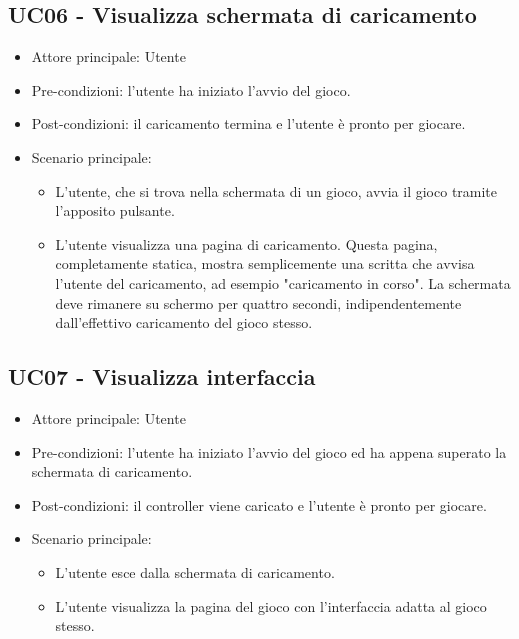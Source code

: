 \subsection{UC06 - Visualizza schermata di caricamento}
\begin{itemize}
    \item Attore principale: Utente
    \item Pre-condizioni: l'utente ha iniziato l'avvio del gioco.
    \item Post-condizioni: il caricamento termina e l'utente è pronto per giocare.
    \item Scenario principale: \begin{itemize}
        \item L'utente, che si trova nella schermata di un gioco, avvia il gioco tramite l'apposito pulsante.
        \item L'utente visualizza una pagina di caricamento. Questa pagina, completamente statica, mostra semplicemente una scritta che avvisa l'utente del caricamento, ad esempio "caricamento in corso". La schermata deve rimanere su schermo per quattro secondi, indipendentemente dall'effettivo caricamento del gioco stesso.
    \end{itemize}
\end{itemize}

\subsection{UC07 - Visualizza interfaccia}
\begin{itemize}
    \item Attore principale: Utente
    \item Pre-condizioni: l'utente ha iniziato l'avvio del gioco ed ha appena superato la schermata di caricamento.
    \item Post-condizioni: il controller viene caricato e l'utente è pronto per giocare.
    \item Scenario principale: \begin{itemize}
        \item L'utente esce dalla schermata di caricamento.
        \item L'utente visualizza la pagina del gioco con l'interfaccia adatta al gioco stesso.
    \end{itemize}
\end{itemize}

